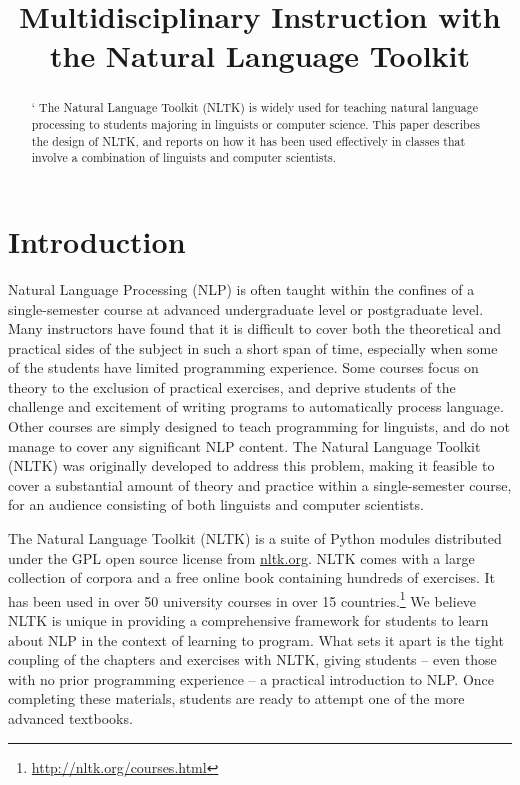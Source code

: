\documentclass[11pt]{article}
\title{Multidisciplinary Instruction with the Natural Language Toolkit}
\author{}
\date{}
\begin{document}
\maketitle
\begin{abstract}
` The Natural Language Toolkit (NLTK) is widely used for teaching
  natural language processing to students majoring in linguists or
  computer science.  This paper describes the design of NLTK, and
  reports on how it has been used effectively in classes that involve
  a combination of linguists and computer scientists.
\end{abstract}

\section{Introduction}

Natural Language Processing (NLP) is often taught within the confines
of a single-semester course at advanced undergraduate level or
postgraduate level. Many instructors have found that it is difficult
to cover both the theoretical and practical sides of the subject in
such a short span of time, especially when some of the students have
limited programming experience. Some courses focus on theory to the
exclusion of practical exercises, and deprive students of the
challenge and excitement of writing programs to automatically process
language. Other courses are simply designed to teach programming for
linguists, and do not manage to cover any significant NLP content. The
Natural Language Toolkit (NLTK) was originally developed to address
this problem, making it feasible to cover a substantial amount of
theory and practice within a single-semester course, for an audience
consisting of both linguists and computer scientists.

The Natural Language Toolkit (NLTK) is a suite of Python modules
distributed under the GPL open source license from \url{nltk.org}.
NLTK comes with a large collection of corpora and a free online book
containing hundreds of exercises.  It has been used in over 50
university courses in over 15 countries.\footnote{\url{http://nltk.org/courses.html}}
We believe NLTK is unique in providing a comprehensive framework
for students to learn about NLP in the context of learning to
program. What sets it apart is the tight coupling of the
chapters and exercises with NLTK, giving students -- even those with no
prior programming experience -- a practical introduction to NLP. Once
completing these materials, students are ready to attempt one of
the more advanced textbooks.
\end{document}
